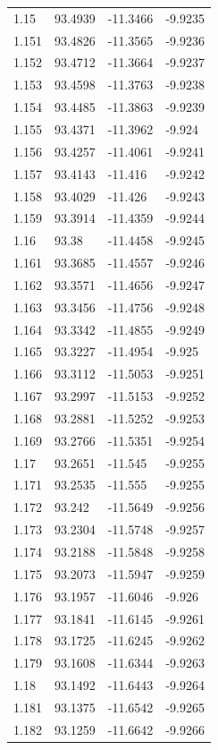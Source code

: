 \begin{tabular}{llll}
1.15 & 93.4939 & -11.3466 & -9.9235 \\
1.151 & 93.4826 & -11.3565 & -9.9236 \\
1.152 & 93.4712 & -11.3664 & -9.9237 \\
1.153 & 93.4598 & -11.3763 & -9.9238 \\
1.154 & 93.4485 & -11.3863 & -9.9239 \\
1.155 & 93.4371 & -11.3962 & -9.924 \\
1.156 & 93.4257 & -11.4061 & -9.9241 \\
1.157 & 93.4143 & -11.416 & -9.9242 \\
1.158 & 93.4029 & -11.426 & -9.9243 \\
1.159 & 93.3914 & -11.4359 & -9.9244 \\
1.16 & 93.38 & -11.4458 & -9.9245 \\
1.161 & 93.3685 & -11.4557 & -9.9246 \\
1.162 & 93.3571 & -11.4656 & -9.9247 \\
1.163 & 93.3456 & -11.4756 & -9.9248 \\
1.164 & 93.3342 & -11.4855 & -9.9249 \\
1.165 & 93.3227 & -11.4954 & -9.925 \\
1.166 & 93.3112 & -11.5053 & -9.9251 \\
1.167 & 93.2997 & -11.5153 & -9.9252 \\
1.168 & 93.2881 & -11.5252 & -9.9253 \\
1.169 & 93.2766 & -11.5351 & -9.9254 \\
1.17 & 93.2651 & -11.545 & -9.9255 \\
1.171 & 93.2535 & -11.555 & -9.9255 \\
1.172 & 93.242 & -11.5649 & -9.9256 \\
1.173 & 93.2304 & -11.5748 & -9.9257 \\
1.174 & 93.2188 & -11.5848 & -9.9258 \\
1.175 & 93.2073 & -11.5947 & -9.9259 \\
1.176 & 93.1957 & -11.6046 & -9.926 \\
1.177 & 93.1841 & -11.6145 & -9.9261 \\
1.178 & 93.1725 & -11.6245 & -9.9262 \\
1.179 & 93.1608 & -11.6344 & -9.9263 \\
1.18 & 93.1492 & -11.6443 & -9.9264 \\
1.181 & 93.1375 & -11.6542 & -9.9265 \\
1.182 & 93.1259 & -11.6642 & -9.9266 \\

\end{tabular}
